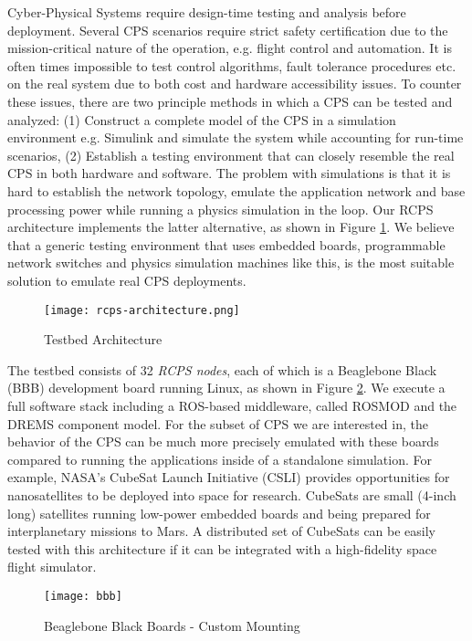Cyber-Physical Systems require design-time testing and analysis before deployment. Several CPS scenarios require strict safety certification due to the mission-critical nature of the operation, e.g. flight
control and automation. It is often times impossible to test control algorithms, fault tolerance procedures etc. on the real system due to both cost and hardware accessibility issues. To counter these issues, there are two principle methods in which a CPS can be tested and analyzed: (1) Construct a complete model of the CPS in a simulation environment e.g. Simulink \cite{Simulink} and simulate the system
while accounting for run-time scenarios, (2) Establish a testing environment that can closely resemble the real CPS in both hardware and software. The problem with simulations is that it is hard to
establish the network topology, emulate the application network and base processing power while running a physics simulation in the loop. Our RCPS architecture implements the latter alternative, as shown in Figure \ref{fig:architecture}. We believe that a generic testing environment that uses embedded boards, programmable network switches and physics simulation machines like this, is the most suitable solution to emulate real CPS deployments.

\begin{figure}[h]
    \centering
    \texttt{[image: rcps-architecture.png]}
    \caption{Testbed Architecture}
    \label{fig:architecture}
\end{figure}

The testbed consists of 32 \emph{RCPS nodes}, each of which is a Beaglebone Black (BBB) \cite{BBB} development board running Linux, as shown in Figure \ref{fig:boards}. We execute a full software stack including a ROS-based middleware, called ROSMOD \cite{kumarROSMOD} and the DREMS component model. For the subset of CPS we are interested in, the behavior of the CPS can be much more precisely emulated with these boards compared to running the applications inside of a standalone simulation. For example, NASA's CubeSat Launch Initiative (CSLI) \cite{CubeSat} provides opportunities for nanosatellites to be deployed into space for research. CubeSats are small (4-inch long) satellites running low-power embedded boards and being prepared for interplanetary missions \cite{CubeSat_Mars} to Mars. A distributed set of CubeSats can be easily tested with this architecture if it can be integrated with a high-fidelity space flight simulator.  

\begin{figure}[h]
    \centering
    \texttt{[image: bbb]}
    \caption{Beaglebone Black Boards - Custom Mounting}
    \label{fig:boards}
\end{figure}

